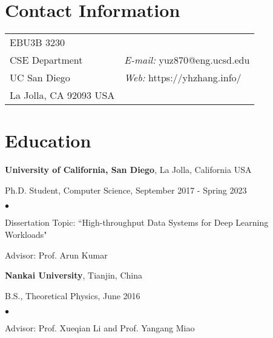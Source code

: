 \documentclass[margin,line]{res}
\newenvironment{list1}{
 \begin{list}{\ding{113}}{%
   \setlength{\itemsep}{0in}
   \setlength{\parsep}{0in} \setlength{\parskip}{0in}
   \setlength{\topsep}{0in} \setlength{\partopsep}{0in} 
   \setlength{\leftmargin}{0.17in}}}{\end{list}}
\newenvironment{list2}{
 \begin{list}{$\bullet$}{%
   \setlength{\itemsep}{0in}
   \setlength{\parsep}{0in} \setlength{\parskip}{0in}
   \setlength{\topsep}{0in} \setlength{\partopsep}{0in} 
   \setlength{\leftmargin}{0.2in}}}{\end{list}}
\begin{document}
\sloppy


\begin{resume}
\section{\sc Contact Information}
\vspace{.05in}
\begin{tabular}{@{}p{2in}p{4in}}
EBU3B 3230       &  \\       
CSE Department  & {\it E-mail:} yuz870@eng.ucsd.edu\\
UC San Diego & {\it Web:} https://yhzhang.info/ \\    
La Jolla, CA 92093 USA & \\   
\end{tabular}

\section{\sc Education}
{\bf University of California, San Diego}, La Jolla, California USA\\
\vspace*{-.1in}
\begin{list1}
\item[] Ph.D. Student, Computer Science, September 2017 - Spring 2023
\begin{list2}
\vspace*{.05in}
\item Dissertation Topic: ``High-throughput Data Systems for Deep Learning Workloads"
\item Advisor: Prof. Arun Kumar
\end{list2}
\end{list1}

{\bf Nankai University}, Tianjin, China\\
\vspace*{-.1in}
\begin{list1}
\item[] B.S., Theoretical Physics, June 2016
\begin{list2}
\item Advisor: Prof. Xueqian Li and Prof. Yangang Miao
\end{list2}
\end{list1}



\end{resume}
\end{document}
